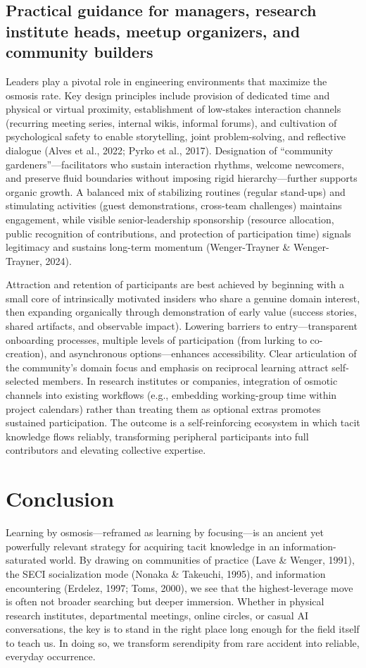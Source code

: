 \documentclass[11pt,a4paper]{article}
\begin{document}
\subsection{Practical guidance for managers, research institute heads, meetup organizers, and community builders}
Leaders play a pivotal role in engineering environments that maximize the osmosis rate. Key design principles include provision of dedicated time and physical or virtual proximity, establishment of low-stakes interaction channels (recurring meeting series, internal wikis, informal forums), and cultivation of psychological safety to enable storytelling, joint problem-solving, and reflective dialogue (Alves et al., 2022; Pyrko et al., 2017). Designation of ``community gardeners''---facilitators who sustain interaction rhythms, welcome newcomers, and preserve fluid boundaries without imposing rigid hierarchy---further supports organic growth. A balanced mix of stabilizing routines (regular stand-ups) and stimulating activities (guest demonstrations, cross-team challenges) maintains engagement, while visible senior-leadership sponsorship (resource allocation, public recognition of contributions, and protection of participation time) signals legitimacy and sustains long-term momentum (Wenger-Trayner \& Wenger-Trayner, 2024).

Attraction and retention of participants are best achieved by beginning with a small core of intrinsically motivated insiders who share a genuine domain interest, then expanding organically through demonstration of early value (success stories, shared artifacts, and observable impact). Lowering barriers to entry---transparent onboarding processes, multiple levels of participation (from lurking to co-creation), and asynchronous options---enhances accessibility. Clear articulation of the community's domain focus and emphasis on reciprocal learning attract self-selected members. In research institutes or companies, integration of osmotic channels into existing workflows (e.g., embedding working-group time within project calendars) rather than treating them as optional extras promotes sustained participation. The outcome is a self-reinforcing ecosystem in which tacit knowledge flows reliably, transforming peripheral participants into full contributors and elevating collective expertise.

\section{Conclusion}
Learning by osmosis---reframed as learning by focusing---is an ancient yet powerfully relevant strategy for acquiring tacit knowledge in an information-saturated world. By drawing on communities of practice (Lave \& Wenger, 1991), the SECI socialization mode (Nonaka \& Takeuchi, 1995), and information encountering (Erdelez, 1997; Toms, 2000), we see that the highest-leverage move is often not broader searching but deeper immersion. Whether in physical research institutes, departmental meetings, online circles, or casual AI conversations, the key is to stand in the right place long enough for the field itself to teach us. In doing so, we transform serendipity from rare accident into reliable, everyday occurrence.
\end{document}

